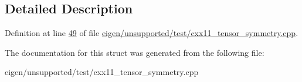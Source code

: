 \subsection{Detailed Description}


Definition at line \hyperlink{eigen_2unsupported_2test_2cxx11__tensor__symmetry_8cpp_source_l00049}{49} of file \hyperlink{eigen_2unsupported_2test_2cxx11__tensor__symmetry_8cpp_source}{eigen/unsupported/test/cxx11\+\_\+tensor\+\_\+symmetry.\+cpp}.



The documentation for this struct was generated from the following file\+:\begin{DoxyCompactItemize}
\item 
eigen/unsupported/test/cxx11\+\_\+tensor\+\_\+symmetry.\+cpp\end{DoxyCompactItemize}
